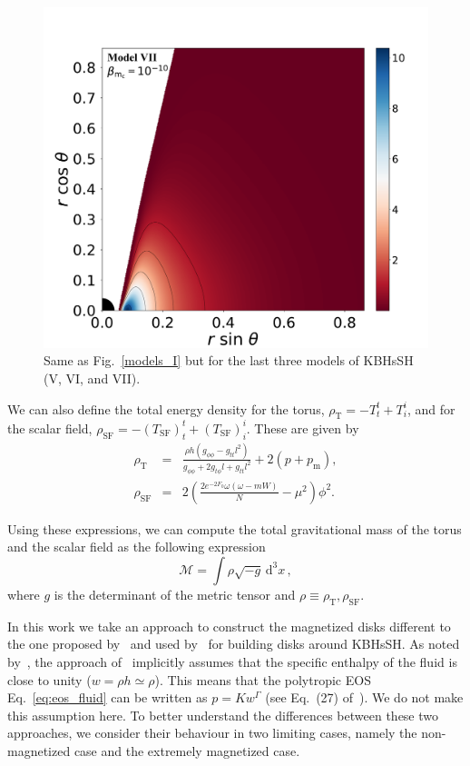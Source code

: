 \documentclass[twocolumn,aps,showpacs,showkeys,prd,superscriptaddress,byrevtex, amsmath]{revtex4-1}
\begin{document}
\begin{figure}
\includegraphics[scale=0.14]{figures/fig2_VII__10.pdf}
\hspace{-0.2cm}
\caption{Same as Fig.~\ref{models_I} but for the last three models of KBHsSH (V, VI, and VII).}
\label{models_II}
\end{figure}

We can also define the total energy density for the torus, $\rho_{\mathrm{T}}=-T^t_t + T^i_i$, and for the scalar field, $\rho_{\mathrm{SF}}=-(T_{\mathrm{SF}})^t_t + (T_{\mathrm{SF}})^i_i$. These are given by
\begin{eqnarray}\label{eq:torus_energy_density}
\rho_{\mathrm{T}} &=&  \frac{\rho h (g_{\phi\phi} - g_{tt} l^2)}{g_{\phi\phi} + 2 g_{t\phi} l + g_{tt} l^2} + 2 (p + p_{\mathrm{m}}),
\\
\rho_{\mathrm{SF}} &=&  2 \left(\frac{2 e^{-2 F_0} \omega (\omega-m W)}{N} - \mu^2\right) \phi^2.
\end{eqnarray}

Using these expressions, we can compute the total gravitational mass of the torus and the scalar field as the following expression
\begin{equation}\label{eq:mass_integral}
\mathcal{M} = \int  \rho \sqrt{-g}\,\mathrm{d}^3x\,,
\end{equation}
where $g$ is the determinant of the metric tensor and $\rho\equiv \rho_{\mathrm{T}}, \rho_{\mathrm{SF}}$.

In this work we take an approach to construct the magnetized disks different to the one proposed by~\citep{Komissarov:2006} and used by~\cite{Vincent:2016} for building disks around KBHsSH. As noted by~\cite{Gimeno-Soler:2017}, the approach of~\citep{Komissarov:2006} implicitly assumes that the specific enthalpy of the fluid is close to unity ($w = \rho h \simeq \rho$). This means that the polytropic EOS Eq.~\eqref{eq:eos_fluid} can be written as $p = K w^{\Gamma}$ (see Eq.~(27) of~\cite{Komissarov:2006}). We do not make this assumption here. To better understand the differences between these two approaches, we consider their behaviour in two limiting cases, namely the non-magnetized case and the extremely magnetized case.
\end{document}
